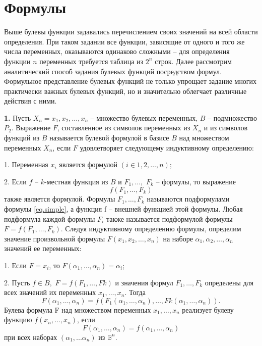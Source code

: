 \documentclass[a4paper, 12pt]{article}
\numberwithin{equation}{section}
\begin{document}
	\tableofcontents 
	\newpage
	\section{Формулы}
	Выше булевы функции задавались перечислением своих значений на всей области определения. При таком задании все функции, зависящие от одного и того же числа переменных, оказываются одинаково сложными -- для определения функции $n$ переменных требуется таблица из $2^{n}$ строк. Далее рассмотрим аналитический способ задания булевых функций посредством формул. Формульное представление булевых функций не только упрощает задание многих практически важных булевых функций, но и значительно облегчает различные действия с ними.
	 
	\textbf{1.} Пусть $X_{n} = {x_{1}, x_{2},\ldots,x_{n}}$ -- множество булевых переменных, $B$ -- подмножество $ P_{2} $. Выражение $F$, составленное из символов переменных из $ X_{n} $ и из символов функций из $B$ называется булевой формулой в базисе $B$ над множеством переменных $ X_{n} $, если $F$ удовлетворяет следующему индуктивному определению:
	 
	1. Переменная $ x_{i} $ является формулой $(i \in {1, 2, \ldots, n});$ 
	
	2. Если $f$ -- $k$-местная функция из $B$ и $F_{1},\ldots,$ $F_{k}$ -- формулы, то выражение
	\begin{equation}
	f(F_{1},\ldots,F_{k})
	\label{eq.simple}
	\end{equation}
	также является формулой. Формулы $F_{1},\ldots, F_{k}$ называются подформулами формулы \eqref{eq.simple}, а функция f -- внешней функцией этой формулы. Любая подформула каждой формулы $ F_{i} $ также называется подформулой формулы $F = f(F_{1},\ldots, F_{k})$. Следуя индуктивному определению формулы, определим значение произвольной формулы $F(x_{1}, x_{2},\ldots,x_{n})$ на наборе $\alpha_{1}, \alpha_{2},\ldots,\alpha_{n}$ значений ее переменных: 
	
	1. Если $F = x_{i}$, то $F(\alpha_{1},\ldots,\alpha_{n}) = \alpha_{i}$;
	
    2. Пусть $f \in B, $ $F = f(F_{1},\ldots, Fk)$ и значения формул $F_{1},\ldots, F_{k}$ определены для всех значений их переменных $x_{1},\ldots,x_{n}$. Тогда
    \begin{equation}
    F(\alpha_{1},\ldots,\alpha_{n}) =f(F_{1}(\alpha_{1},\ldots,\alpha_{n}),\ldots, Fk(\alpha_{1},\ldots,\alpha_{n})). 
    \end{equation}
    Булева формула F над множеством переменных $x_{1},\ldots,x_{n}$ реализует булеву функцию $f(x_{n},\ldots,x_{n})$, если
    	\begin{equation}
    F(\alpha_{1},\ldots,\alpha_{n}) =f(\alpha_{1},\ldots,\alpha_{n})
    \end{equation}
    при всех наборах $ (\alpha_{1},...\alpha_{n})$ из $ {\mathbb B^{n}} $.
    
\end{document}
